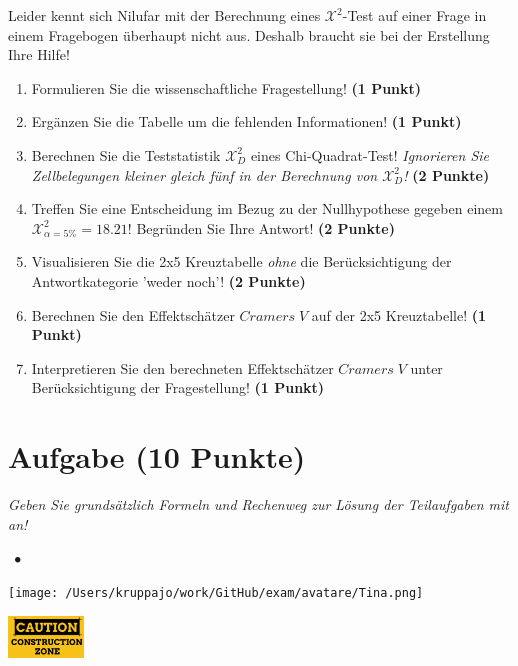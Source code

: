\documentclass[a4paper, 9pt]{scrartcl}\usepackage[]{graphicx}\usepackage[]{xcolor}
\begin{document}
\vspace{5Ex}

Leider kennt sich Nilufar mit der Berechnung eines $\mathcal{X}^2$-Test auf einer Frage in einem Fragebogen überhaupt nicht aus. Deshalb braucht sie bei der Erstellung Ihre Hilfe!

\begin{enumerate}
\item Formulieren Sie die wissenschaftliche Fragestellung! \textbf{(1 Punkt)}
\item Ergänzen Sie die Tabelle um die fehlenden Informationen! \textbf{(1 Punkt)} 
\item Berechnen Sie die Teststatistik $\mathcal{X}^2_{D}$ eines Chi-Quadrat-Test! \textit{Ignorieren Sie Zellbelegungen kleiner gleich fünf in der Berechnung von $\mathcal{X}^2_{D}$!} \textbf{(2 Punkte)}
\item Treffen Sie eine Entscheidung im Bezug zu der Nullhypothese gegeben
  einem $\mathcal{X}^2_{\alpha = 5\%} = 18.21$! Begründen Sie Ihre Antwort!
  \textbf{(2 Punkte)}
\item Visualisieren Sie die 2x5 Kreuztabelle \textit{ohne} die Berücksichtigung der Antwortkategorie 'weder noch'! \textbf{(2 Punkte)}
\item Berechnen Sie den Effektschätzer $Cramers\; V$ auf der 2x5 Kreuztabelle! \textbf{(1 Punkt)}
\item Interpretieren Sie den berechneten Effektschätzer $Cramers\; V$ unter Berücksichtigung der Fragestellung! \textbf{(1 Punkt)}
\end{enumerate} 
\clearpage

\section{Aufgabe \hfill (10 Punkte)}

\textit{Geben Sie grundsätzlich Formeln und Rechenweg zur Lösung der Teilaufgaben mit an!} \\[1Ex]
 

 
\ifcollection
\begin{flushright}
\tiny\vspace{-3Ex}
\textbf{\examinhaltstart}
\exammodulestat $\;\bullet$
\exammodulestatbbv 
\vspace{-4Ex}
\end{flushright}
\begin{minipage}[t]{0.5\textwidth}
\texttt{[image: /Users/kruppajo/work/GitHub/exam/avatare/Tina.png]}
\end{minipage}
\begin{minipage}[t]{0.5\textwidth}
\hfill
\href{https://youtu.be/-Kva5wc5Elw}{\includegraphics[width = 2cm]{img/caution}}
\end{minipage}
\vspace{-3Ex}
\fi
\end{document}
